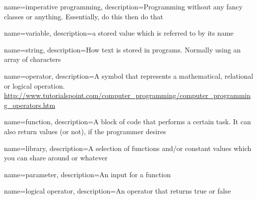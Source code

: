 {
    name={imperative programming},
    description={Programming without any fancy classes or anything. Essentially, do this then do that}
}

{
    name={variable},
    description={a stored value which is referred to by its name}
}

{
    name={string},
    description={How text is stored in programs. Normally using an array of characters}
}

{
    name={operator},
    description={A symbol that represents a mathematical, relational or logical operation. \url{http://www.tutorialspoint.com/computer_programming/computer_programming_operators.htm}}
}

{
    name={function},
    description={A block of code that performs a certain task. It can also return values (or not), if the programmer desires}
}

{
    name={library},
    description={A selection of functions and/or constant values which you can share around or whatever}
}

{
    name={parameter},
    description={An input for a function}
}

{
    name={logical operator},
    description={An operator that returns true or false}
}
